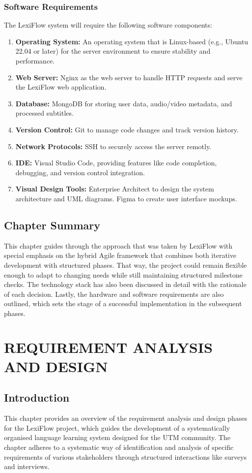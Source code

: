\documentclass[oneside]{utmthesis}
\begin{document}
\subsection{Software Requirements}
The LexiFlow system will require the following software components:
\begin{enumerate}[label= (\alph*)]
    \item \textbf{Operating System:} An operating system that is Linux-based (e.g., Ubuntu 22.04 or later) for the server environment to ensure stability and performance.
    \item \textbf{Web Server:} Nginx as the web server to handle HTTP requests and serve the LexiFlow web application.
    \item \textbf{Database:} MongoDB for storing user data, audio/video metadata, and processed subtitles.
    \item \textbf{Version Control:} Git to manage code changes and track version history.
    \item \textbf{Network Protocols:} SSH to securely access the server remotly.
    \item \textbf{IDE:} Visual Studio Code, providing features like code completion, debugging, and version control integration.
    \item \textbf{Visual Design Tools:} Enterprise Architect to design the system architecture and UML diagrams. Figma to create user interface mockups.
\end{enumerate}



\section{Chapter Summary}
This chapter guides through the approach that was taken by LexiFlow with special emphasis on the hybrid Agile framework that combines both iterative development with structured phases. That way, the project could remain flexible enough to adapt to changing needs while still maintaining structured milestone checks. The technology stack has also been discussed in detail with the rationale of each decision. Lastly, the hardware and software requirements are also outlined, which sets the stage of a successful implementation in the subsequent phases.

\chapter{REQUIREMENT ANALYSIS AND DESIGN}
\section{Introduction}
This chapter provides an overview of the requirement analysis and design phases for the LexiFlow project, which guides the development of a systematically organised language learning system designed for the UTM community. The chapter adheres to a systematic way of identification and analysis of specific requirements of various stakeholders through structured interactions like surveys and interviews.
\end{document}

